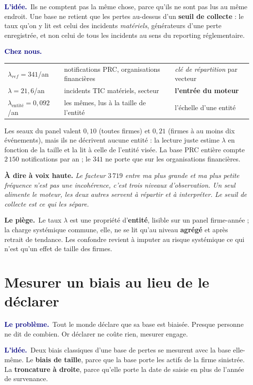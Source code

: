 \documentclass[11pt,a4paper]{article}
\newcommand{\lequoi}[1]{\smallskip\noindent\textcolor{navy}{\textbf{Le problème.}}\ #1\par}
\newcommand{\lidee}[1]{\smallskip\noindent\textcolor{navy}{\textbf{L'idée.}}\ #1\par}
\newcommand{\cheznous}[1]{\smallskip\noindent\textcolor{navy}{\textbf{Chez nous.}}\ #1\par}
\newcommand{\lepiege}[1]{\smallskip\noindent\textcolor{accent}{\textbf{Le piège.}}\ #1\par}
\newcommand{\laphrase}[1]{\begin{phrasebox}\textbf{À dire à voix haute.} \emph{#1}\end{phrasebox}}
\begin{document}
\lidee{Ils ne comptent pas la même chose, parce qu'ils ne sont pas lus au même endroit. Une
base ne retient que les pertes au-dessus d'un \textbf{seuil de collecte} : le taux qu'on y lit
est celui des incidents \emph{matériels}, générateurs d'une perte enregistrée, et non celui de
tous les incidents au sens du reporting réglementaire.}

\cheznous{\;\\[-6pt]
\begin{center}\small
\begin{tabular}{@{}l l l@{}}
\toprule
$\lambda_{ref}=341$/an & notifications PRC, organisations financières & \emph{clé de répartition} par vecteur \\
$\lambda=21{,}6$/an & incidents TIC matériels, secteur & \textbf{l'entrée du moteur} \\
$\lambda_{\text{entité}}=0{,}092$/an & les mêmes, lus à la taille de l'entité & l'échelle d'une entité \\
\bottomrule
\end{tabular}
\end{center}
Les seaux du panel valent $0{,}10$ (toutes firmes) et $0{,}21$ (firmes à au moins dix événements),
mais ils ne décrivent aucune entité : la lecture juste estime $\lambda$ en fonction de la taille et
la lit à celle de l'entité visée. La base PRC entière compte $2\,150$ notifications par an ; le
$341$ ne porte que sur les organisations financières.}

\laphrase{Le facteur $3\,719$ entre ma plus grande et ma plus petite fréquence n'est pas une
incohérence, c'est trois niveaux d'observation. Un seul alimente le moteur, les deux autres servent
à répartir et à interpréter. Le seuil de collecte est ce qui les sépare.}

\lepiege{Le taux $\lambda$ est une propriété d'\textbf{entité}, lisible sur un panel
firme-année ; la charge systémique commune, elle, ne se lit qu'au niveau \textbf{agrégé} et
après retrait de tendance. Les confondre revient à imputer au risque systémique ce qui n'est
qu'un effet de taille des firmes.}

\section{Mesurer un biais au lieu de le déclarer}

\lequoi{Tout le monde déclare que sa base est biaisée. Presque personne ne dit de combien. Or
déclarer ne coûte rien, mesurer engage.}

\lidee{Deux biais classiques d'une base de pertes se mesurent avec la base elle-même. Le
\textbf{biais de taille}, parce que la base porte les actifs de la firme sinistrée. La
\textbf{troncature à droite}, parce qu'elle porte la date de saisie en plus de l'année de
survenance.}
\end{document}
